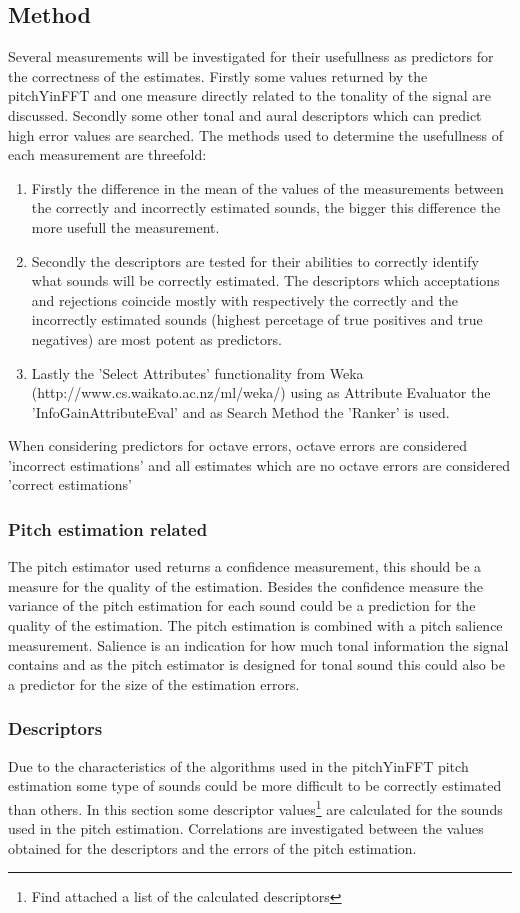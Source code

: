 \documentclass{proc}
\begin{document}
\subsection{Method}
Several measurements will be investigated for their usefullness as predictors for the correctness of the estimates. Firstly some values returned by the pitchYinFFT and one measure directly related to the tonality of the signal are discussed. Secondly some other tonal and aural descriptors which can predict high error values are searched. The methods used to determine the usefullness of each measurement are threefold:
\begin{enumerate}
    \item Firstly the difference in the mean of the values of the measurements between the correctly and incorrectly estimated sounds, the bigger this difference the more usefull the measurement. 
    \item Secondly the descriptors are tested for their abilities to correctly identify what sounds will be correctly estimated. The descriptors which acceptations and rejections coincide mostly with respectively the correctly and the incorrectly estimated sounds (highest percetage of true positives and true negatives) are most potent as predictors. 
    \item Lastly the 'Select Attributes' functionality from Weka (http://www.cs.waikato.ac.nz/ml/weka/) using as Attribute Evaluator the 'InfoGainAttributeEval' and as Search Method the 'Ranker' is used.
\end{enumerate}
When considering predictors for octave errors, octave errors are considered 'incorrect estimations' and all estimates which are no octave errors are considered 'correct estimations'

\subsubsection{Pitch estimation related}
The pitch estimator used returns a confidence measurement, this should be a measure for the quality of the estimation. Besides the confidence measure the variance of the pitch estimation for each sound could be a prediction for the quality of the estimation. The pitch estimation is combined with a pitch salience measurement. Salience is an indication for how much tonal information the signal contains and as the pitch estimator is designed for tonal sound this could also be a predictor for the size of the estimation errors.

\subsubsection{Descriptors}
Due to the characteristics of the algorithms used in the pitchYinFFT pitch estimation some type of sounds could be more difficult to be correctly estimated than others. In this section some descriptor values\footnote{Find attached a list of the calculated descriptors} are calculated for the sounds used in the pitch estimation. Correlations are investigated between the values obtained for the descriptors and the errors of the pitch estimation. 
\end{document}
